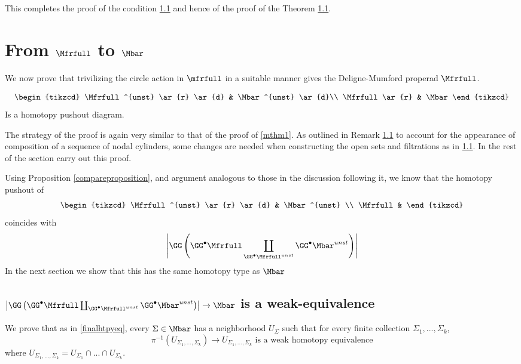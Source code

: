 \documentclass[a4paper,10pt]{amsart}
\begin{document}
	This completes the proof of the condition \ref{} and hence of the proof of the Theorem \ref{}.
\section{From $\Mfrfull$ to $\Mbar$}
We now prove that trivilizing the circle action in $\mfrfull$ in a suitable manner gives the Deligne-Mumford properad $\Mfrfull$.

\begin{theorem}\label{mbarmainthm}
	\[ 
		\begin{tikzcd}
			\Mfrfull^{unst} \ar{r} \ar{d} & \Mbar^{unst} \ar{d}\\
			\Mfrfull \ar{r} & \Mbar
		\end{tikzcd}
	\]
	Is a homotopy pushout diagram.
\end{theorem}


The strategy of the proof is again very similar to that of the proof of \ref{mthm1}. As outlined in Remark \ref{} to account for the appearance of composition of a sequence of nodal cylinders, some changes are needed when constructing the open sets and filtrations as in \ref{}. In the rest of the section carry out this proof.

Using Proposition \ref{compareproposition}, and argument analogous to those in the discussion following it, we know that the homotopy pushout of 
	\[ 
		\begin{tikzcd}
			\Mfrfull^{unst} \ar{r} \ar{d} & \Mbar^{unst} \\
			\Mfrfull &
		\end{tikzcd}
	\]
coincides with 
\[ \left| \GG \left( \GG^{\bullet}\Mfrfull \coprod_{\GG^{\bullet}\Mfrfull^{unst}} \GG^{\bullet} \Mbar^{unst} \right) \right| \]
In the next section we show that this has the same homotopy type as $\Mbar$

\subsection{$\left| \GG \left( \GG^{\bullet}\Mfrfull \coprod_{\GG^{\bullet}\Mfrfull^{unst}} \GG^{\bullet} \Mbar^{unst} \right) \right| \to \Mbar$ is a weak-equivalence}
We prove that as in \ref{finalhtpyeq},  every $\Sigma \in \Mbar$ has a neighborhood $U_{\Sigma}$ such that for every finite collection $\Sigma_1,...,\Sigma_k$, 
\begin{equation}
	\label{finintwheq} \pi^{-1}(U_{\Sigma_1,...,\Sigma_k}) \to U_{\Sigma_1,...,\Sigma_k} \mbox{ is a weak homotopy equivalence}
\end{equation}
where $U_{\Sigma_1,...,\Sigma_k} = U_{\Sigma_1} \cap ... \cap U_{\Sigma_k}$.
\end{document}
